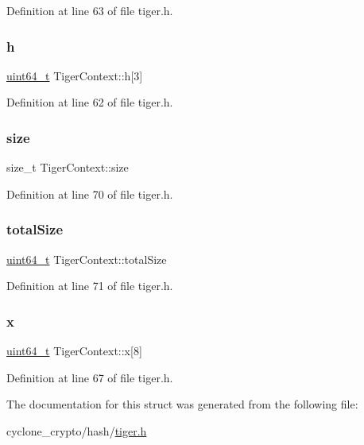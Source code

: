 Definition at line 63 of file tiger.\+h.

\mbox{\label{structTigerContext_a8e54fa64e078ac5f8b1ebeaefd0ca602}} 
\subsubsection{\texorpdfstring{h}{h}}
{\footnotesize\ttfamily \hyperlink{stdint_8h_aec6fcb673ff035718c238c8c9d544c47}{uint64\+\_\+t} Tiger\+Context\+::h\mbox{[}3\mbox{]}}



Definition at line 62 of file tiger.\+h.

\mbox{\label{structTigerContext_aa3ff260b3910a8d860222d6807264218}} 
\subsubsection{\texorpdfstring{size}{size}}
{\footnotesize\ttfamily size\+\_\+t Tiger\+Context\+::size}



Definition at line 70 of file tiger.\+h.

\mbox{\label{structTigerContext_a2d2f2089fef588839923dd19bbcac2e5}} 
\subsubsection{\texorpdfstring{total\+Size}{totalSize}}
{\footnotesize\ttfamily \hyperlink{stdint_8h_aec6fcb673ff035718c238c8c9d544c47}{uint64\+\_\+t} Tiger\+Context\+::total\+Size}



Definition at line 71 of file tiger.\+h.

\mbox{\label{structTigerContext_ad02bc24aa1dea4fa38c1f8e22593a4e5}} 
\subsubsection{\texorpdfstring{x}{x}}
{\footnotesize\ttfamily \hyperlink{stdint_8h_aec6fcb673ff035718c238c8c9d544c47}{uint64\+\_\+t} Tiger\+Context\+::x\mbox{[}8\mbox{]}}



Definition at line 67 of file tiger.\+h.



The documentation for this struct was generated from the following file\+:\begin{DoxyCompactItemize}
\item 
cyclone\+\_\+crypto/hash/\hyperlink{tiger_8h}{tiger.\+h}\end{DoxyCompactItemize}
